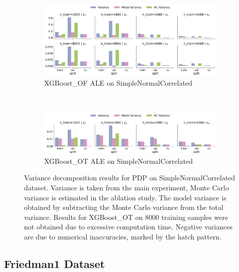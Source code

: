 \documentclass[runningheads]{llncs}
\begin{document}
\begin{figure}[htbp]
    \centering
    \begin{subfigure}[b]{0.75\textwidth}
        \includegraphics[width=\textwidth]{img/SNC-all/variance_decomposition_ale_XGBoost_OF.png}
        \caption{XGBoost\_OF ALE on SimpleNormalCorrelated}
    \end{subfigure}
    \\[10pt]
    \vfill
    \begin{subfigure}[b]{0.75\textwidth}
        \includegraphics[width=\textwidth]{img/SNC-all/variance_decomposition_ale_XGBoost_OT.png}
        \caption{XGBoost\_OT ALE on SimpleNormalCorrelated}
    \end{subfigure}
    \caption{Variance decomposition results for PDP on SimpleNormalCorrelated dataset. Variance is taken from the
    main experiment, Monte Carlo variance is estimated in the ablation study. The model variance is
    obtained by subtracting the Monte Carlo variance from the total variance. Results for XGBoost\_OT
    on 8000 training samples were not obtained due to excessive computation time. Negative variances are
    due to numerical inaccuracies, marked by the hatch pattern.}
    \label{fig:ale-variance-decomp-snc}  %
\end{figure}

\clearpage
\subsection{Friedman1 Dataset}
\end{document}
